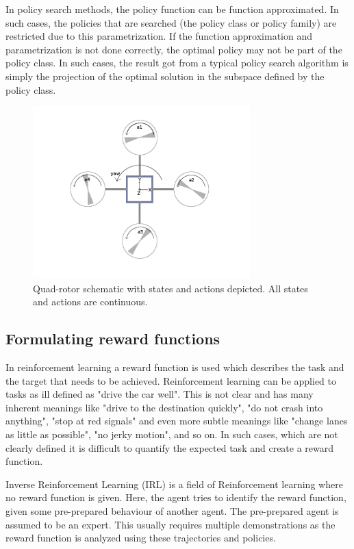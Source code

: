 \documentclass[hidelinks,BTech]{iitmdiss}
\begin{document}
In policy search methods, the policy function can be function approximated. In such cases, the policies that are searched (the policy class or policy family) are restricted due to this parametrization. If the function approximation and parametrization is not done correctly, the optimal policy may not be part of the policy class. In such cases, the result got from a typical policy search algorithm is simply the projection of the optimal solution in the subspace defined by the policy class.

\begin{figure}[H]
  \centering
    \includegraphics[width=0.75\textwidth]{quadrotor_states_actions.png}
    \caption{Quad-rotor schematic with states and actions depicted. All states and actions are continuous.}
\end{figure}

\subsection{Formulating reward functions}

In reinforcement learning a reward function is used which describes the task and the target that needs to be achieved. Reinforcement learning can be applied to tasks as ill defined as "drive the car well". This is not clear and has many inherent meanings like "drive to the destination quickly", "do not crash into anything", "stop at red signals" and even more subtle meanings like "change lanes as little as possible", "no jerky motion", and so on. In such cases, which are not clearly defined it is difficult to quantify the expected task and create a reward function.

Inverse Reinforcement Learning (IRL) is a field of Reinforcement learning where no reward function is given. Here, the agent tries to identify the reward function, given some pre-prepared behaviour of another agent. The pre-prepared agent is assumed to be an expert. This usually requires multiple demonstrations as the reward function is analyzed using these trajectories and policies.
\end{document}
